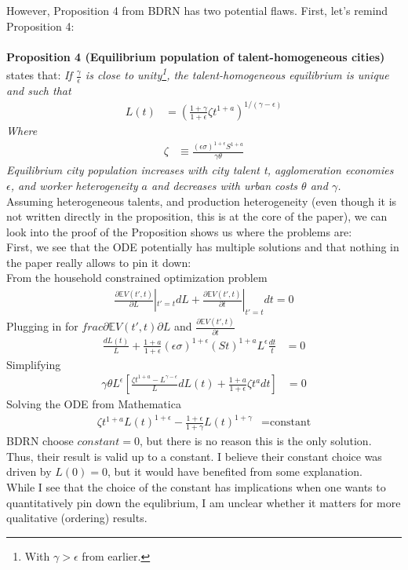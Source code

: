 \documentclass[10pt, final]{article}
\newcommand{\pa}{\mathcal \partial}
\begin{document}
However, Proposition 4 from BDRN has two potential flaws. 
First, let's remind Proposition 4: \\
\\
\textbf{Proposition 4 (Equilibrium population of talent-homogeneous cities)} states that: \textit{If $\frac{\gamma}{\epsilon}$ is close to unity\footnote{With $\gamma > \epsilon$ from earlier.}, the talent-homogeneous equilibrium is unique and such that
\begin{align*}
    L(t) &= (\frac{1 + \gamma}{1 + \epsilon} \zeta t^{1+a})^{1/(\gamma - \epsilon)}
\end{align*}
Where
\begin{align*}
    \zeta &\equiv \frac{(\epsilon \sigma)^{1+ \epsilon} S^{1+a}}{\gamma \theta}
\end{align*}
Equilibrium city population increases with city talent t, agglomeration economies $\epsilon$, and worker heterogeneity $a$ and decreases with urban costs $\theta$ and $\gamma$.
}
\\
Assuming heterogeneous talents, and production heterogeneity (even though it is not written directly in the proposition, this is at the core of the paper), we can look into the proof of the Proposition shows us where the problems are: \\
First, we see that the ODE potentially has multiple solutions and that nothing in the paper really allows to pin it down:
\\
From the household constrained optimization problem
\begin{align*}
    \frac{\pa \mathbb{E} V(t',t)}{\pa L}|_{t'=t} dL + \frac{\pa \mathbb{E} V(t', t)}{\pa t}|_{t'=t} dt = 0
\end{align*}
Plugging in for $frac{\pa \mathbb{E} V(t',t)}{\pa L}$ and $\frac{\pa \mathbb{E} V(t', t)}{\pa t}$
\begin{align*}
    [(\epsilon \sigma)^{1+\epsilon} (St)^{1+a} L^\epsilon - \theta \gamma L^{\gamma}]\frac{d L(t)}{L} + \frac{1+a}{1+\epsilon}(\epsilon \sigma)^{1+\epsilon} (St)^{1+a} L^\epsilon \frac{d t}{t} &= 0
\end{align*} 
Simplifying
\begin{align*}
    \gamma \theta L^{\epsilon}[\frac{\zeta t^{1+a} - L^{\gamma-\epsilon}}{L} d L(t) + \frac{1+a}{1+\epsilon} \zeta t^a dt] &= 0
\end{align*}
Solving the ODE from Mathematica
\begin{align*}
    \zeta t^{1+a} L(t)^{1+\epsilon} - \frac{1+\epsilon}{1+\gamma} L(t)^{1+\gamma} &= \text{constant}
\end{align*}
BDRN choose $constant = 0$, but there is no reason this is the only solution. Thus, their result is valid up to a constant. I believe their constant choice was driven by $L(0) = 0$, but it would have benefited from some explanation.\\
While I see that the choice of the constant has implications when one wants to quantitatively pin down the equlibrium, I am unclear whether it matters for more qualitative (ordering) results.
\\
\end{document}
